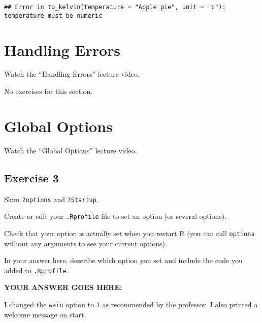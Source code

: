 \documentclass[
]{article}
\begin{document}
\begin{verbatim}
## Error in to_kelvin(temperature = "Apple pie", unit = "c"): temperature must be numeric
\end{verbatim}

\hypertarget{handling-errors}{%
\section{Handling Errors}\label{handling-errors}}

Watch the ``Handling Errors'' lecture video.

No exercises for this section.

\hypertarget{global-options}{%
\section{Global Options}\label{global-options}}

Watch the ``Global Options'' lecture video.

\hypertarget{exercise-3}{%
\subsection{Exercise 3}\label{exercise-3}}

Skim \texttt{?options} and \texttt{?Startup}.

Create or edit your \texttt{.Rprofile} file to set an option (or several
options).

Check that your option is actually set when you restart R (you can call
\texttt{options} without any arguments to see your current options).

In your answer here, describe which option you set and include the code
you added to \texttt{.Rprofile}.

\textbf{YOUR ANSWER GOES HERE:}

I changed the \texttt{warn} option to 1 as recommended by the professor.
I also printed a welcome message on start.
\end{document}
